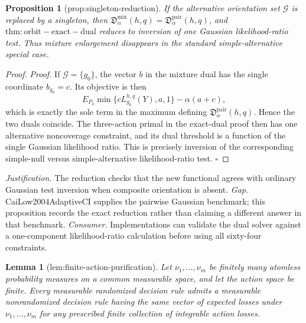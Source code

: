 \documentclass{article}
\newtheorem{lemma}{Lemma}
\newtheorem{proposition}{Proposition}
\begin{document}
\begin{proposition}[prop:singleton-reduction]\label{prop:singleton-reduction}
If the alternative orientation set \(\mathcal G\) is replaced by a singleton, then \(\mathfrak D_{\alpha}^{\mathrm{mix}}(h,q)=\mathfrak D_{\alpha}^{\mathrm{pair}}(h,q)\), and \(\mathrm{thm:orbit-exact-dual}\) reduces to inversion of one Gaussian likelihood-ratio test. Thus mixture enlargement disappears in the standard simple-alternative special case.
\end{proposition}
\begin{proof}
\textit{Proof.}
If \(\mathcal G=\{g_0\}\), the vector \(b\) in the mixture dual has the single
coordinate \(b_{g_0}=c\).  Its objective is then
\[
E_{P_0}\min\{cL_{g_0}^{h,q}(Y),a,1\}-\alpha(a+c),
\]
which is exactly the sole term in the maximum defining
\(\mathfrak D_\alpha^{\mathrm{pair}}(h,q)\).  Hence the two duals coincide.
The three-action primal in the exact-dual proof then has one alternative
noncoverage constraint, and its dual threshold is a function of the single
Gaussian likelihood ratio.  This is precisely inversion of the corresponding
simple-null versus simple-alternative likelihood-ratio test. \(\square\)
\end{proof}
\par\smallskip\noindent \textit{Justification.} The reduction checks that the new functional agrees with ordinary Gaussian test inversion when composite orientation is absent. \textit{Gap.} CaiLow2004AdaptiveCI supplies the pairwise Gaussian benchmark; this proposition records the exact reduction rather than claiming a different answer in that benchmark. \textit{Consumer.} Implementations can validate the dual solver against a one-component likelihood-ratio calculation before using all sixty-four constraints.

\begin{lemma}[lem:finite-action-purification]\label{lem:finite-action-purification}
Let \(\nu_1,\ldots,\nu_m\) be finitely many atomless probability measures on a common measurable space, and let the action space be finite.  Every measurable randomized decision rule admits a measurable nonrandomized decision rule having the same vector of expected losses under \(\nu_1,\ldots,\nu_m\) for any prescribed finite collection of integrable action losses.
\end{lemma}
\end{document}
